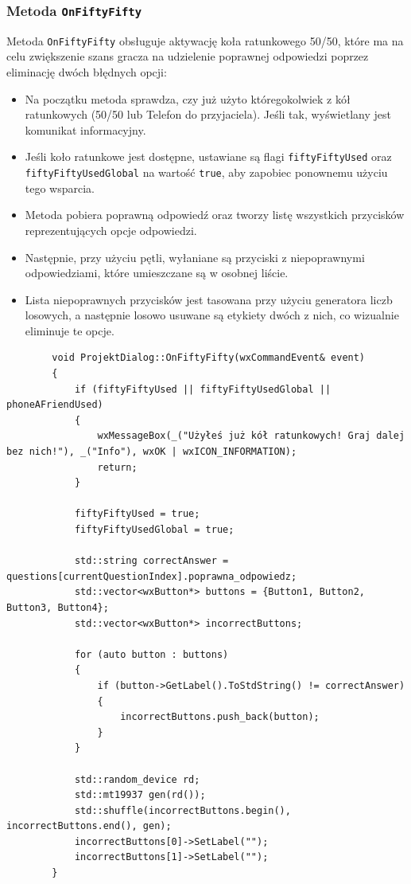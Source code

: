 \documentclass[]{article}
\begin{document}
	\subsubsection{Metoda \texttt{OnFiftyFifty}}

Metoda \texttt{OnFiftyFifty} obsługuje aktywację koła ratunkowego 50/50, które ma na celu zwiększenie szans gracza na udzielenie poprawnej odpowiedzi poprzez eliminację dwóch błędnych opcji:
\begin{itemize}
	\item Na początku metoda sprawdza, czy już użyto któregokolwiek z kół ratunkowych (50/50 lub Telefon do przyjaciela). Jeśli tak, wyświetlany jest komunikat informacyjny.
	\item Jeśli koło ratunkowe jest dostępne, ustawiane są flagi \texttt{fiftyFiftyUsed} oraz \texttt{fiftyFiftyUsedGlobal} na wartość \texttt{true}, aby zapobiec ponownemu użyciu tego wsparcia.
	\item Metoda pobiera poprawną odpowiedź oraz tworzy listę wszystkich przycisków reprezentujących opcje odpowiedzi.
	\item Następnie, przy użyciu pętli, wyłaniane są przyciski z niepoprawnymi odpowiedziami, które umieszczane są w osobnej liście.
	\item Lista niepoprawnych przycisków jest tasowana przy użyciu generatora liczb losowych, a następnie losowo usuwane są etykiety dwóch z nich, co wizualnie eliminuje te opcje.
\end{itemize}
	\begin{verbatim}
		void ProjektDialog::OnFiftyFifty(wxCommandEvent& event)
		{
			if (fiftyFiftyUsed || fiftyFiftyUsedGlobal || phoneAFriendUsed)
			{
				wxMessageBox(_("Użyłeś już kół ratunkowych! Graj dalej bez nich!"), _("Info"), wxOK | wxICON_INFORMATION);
				return;
			}
			
			fiftyFiftyUsed = true;
			fiftyFiftyUsedGlobal = true;
			
			std::string correctAnswer = questions[currentQuestionIndex].poprawna_odpowiedz;
			std::vector<wxButton*> buttons = {Button1, Button2, Button3, Button4};
			std::vector<wxButton*> incorrectButtons;
			
			for (auto button : buttons)
			{
				if (button->GetLabel().ToStdString() != correctAnswer)
				{
					incorrectButtons.push_back(button);
				}
			}
			
			std::random_device rd;
			std::mt19937 gen(rd());
			std::shuffle(incorrectButtons.begin(), incorrectButtons.end(), gen);
			incorrectButtons[0]->SetLabel("");
			incorrectButtons[1]->SetLabel("");
		}
	\end{verbatim}
\end{document}
